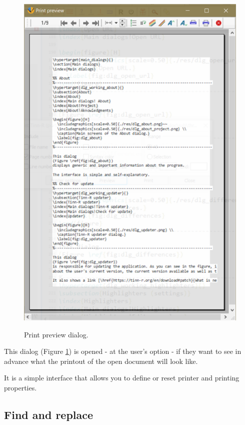\begin{figure}[H]
  \includegraphics[scale=0.8]{./res/dlg_print_preview.png} \\
  \caption{Print preview dialog.}
  \label{fig:dlg_print_preview}
\end{figure}
This dialog
(Figure \ref{fig:dlg_print_preview})
is opened - at the user's option - if they want to see in advance what the printout of
the open document will look like.

It is a simple interface that allows you to define or reset printer and printing properties.


\hypertarget{find_replace}{}
\subsection{Find and replace}

